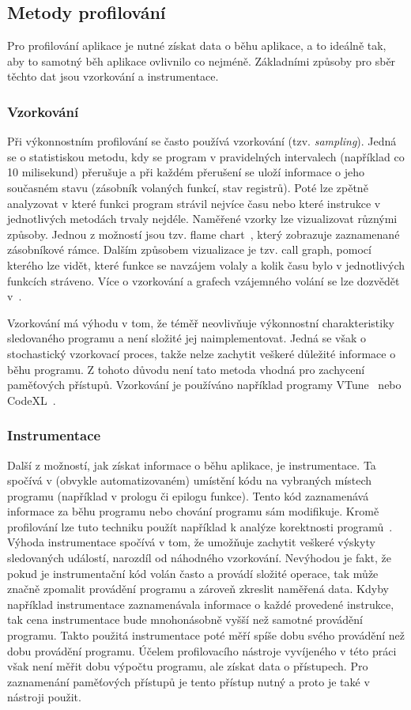 \subsection{Metody profilování}
Pro profilování aplikace je nutné získat data o běhu aplikace, a to ideálně tak, aby to samotný běh aplikace ovlivnilo co nejméně. Základními způsoby pro sběr těchto dat jsou vzorkování a instrumentace.

\subsubsection{Vzorkování}
Při výkonnostním profilování se často používá vzorkování (tzv. \emph{sampling}). Jedná se o statistiskou metodu, kdy se program v pravidelných intervalech (například co 10 milisekund) přerušuje a při každém přerušení se uloží informace o jeho současném stavu (zásobník volaných funkcí, stav registrů). Poté lze zpětně analyzovat v které funkci program strávil nejvíce času nebo které instrukce v jednotlivých metodách trvaly nejdéle. Naměřené vzorky lze vizualizovat různými způsoby. Jednou z možností jsou tzv. flame chart~\cite{flamegraph}, který zobrazuje zaznamenané zásobníkové rámce. Dalším způsobem vizualizace je tzv. call graph, pomocí kterého lze vidět, které funkce se navzájem volaly a kolik času bylo v jednotlivých funkcích stráveno. Více o vzorkování a grafech vzájemného volání se lze dozvědět v~\cite{gprof}.

Vzorkování má výhodu v tom, že téměř neovlivňuje výkonnostní charakteristiky sledovaného programu a není složité jej naimplementovat. Jedná se však o stochastický vzorkovací proces, takže nelze zachytit veškeré důležité informace o běhu programu. Z tohoto důvodu není tato metoda vhodná pro zachycení paměťových přístupů. Vzorkování je používáno například programy VTune~\cite{vtune} nebo CodeXL~\cite{codexl}.

\subsubsection{Instrumentace}
Další z možností, jak získat informace o běhu aplikace, je instrumentace. Ta spočívá v (obvykle automatizovaném) umístění kódu na vybraných místech programu (například v prologu či epilogu funkce). Tento kód zaznamenává informace za běhu programu nebo chování programu sám modifikuje. Kromě profilování lze tuto techniku použít například k analýze korektnosti programů~\cite{memcheck}. Výhoda instrumentace spočívá v tom, že umožňuje zachytit veškeré výskyty sledovaných událostí, narozdíl od náhodného vzorkování. Nevýhodou je fakt, že pokud je instrumentační kód volán často a provádí složité operace, tak může značně zpomalit provádění programu a zároveň zkreslit naměřená data. Kdyby například instrumentace zaznamenávala informace o každé provedené instrukce, tak cena instrumentace bude mnohonásobně vyšší než samotné provádění programu. Takto použitá instrumentace poté měří spíše dobu svého provádění než dobu provádění programu. Účelem profilovacího nástroje vyvíjeného v této práci však není měřit dobu výpočtu programu, ale získat data o přístupech. Pro zaznamenání paměťových přístupů je tento přístup nutný a proto je také v nástroji použit.

